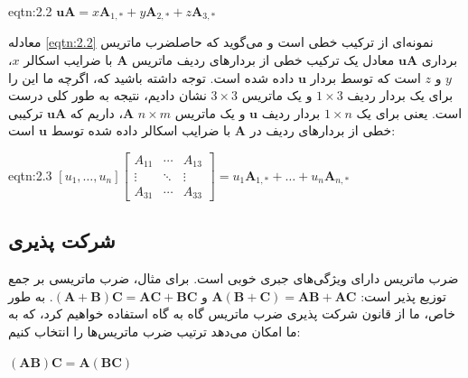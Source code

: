 {\begin{spacing}{1.5}
        \begin{eqtn}{eqtn:2.2}
            \centering
            $\textbf{uA}=x\textbf{A}_{1,*}+y\textbf{A}_{2,*}+z\textbf{A}_{3,*}$
        \end{eqtn}

        معادله \ref{eqtn:2.2} نمونه‌ای از ترکیب خطی است و
        می‌گوید که حاصلضرب ماتریس برداری $\textbf{uA}$ معادل یک ترکیب خطی از بردارهای ردیف ماتریس $\textbf{A}$ با ضرایب اسکالر $x$، $y$ و $z$ است که توسط بردار $\textbf{u}$ داده شده است.
        توجه داشته باشید که، اگرچه ما این را برای یک بردار ردیف $1\times 3$ و یک ماتریس $3\times 3$ نشان دادیم، نتیجه به طور کلی درست است.
        یعنی برای یک $1\times n$ بردار ردیف $\textbf{u}$ و یک ماتریس $n\times m$ $\textbf{A}$، داریم که $\textbf{uA}$ ترکیبی خطی از بردارهای ردیف در $\textbf{A}$ با ضرایب اسکالر داده شده توسط $\textbf{u}$ است:

        \begin{eqtn}{eqtn:2.3}
            \centering
            $[u_{1},\dots,u_{n}]\begin{bmatrix}
                                    A_{11} & \cdots & A_{13} \\
                                    \vdots & \ddots & \vdots \\
                                    A_{31} & \cdots & A_{33}
            \end{bmatrix}=u_{1}\textbf{A}_{1,*}+\dots+u_{n}\textbf{A}_{n,*}$
        \end{eqtn}
    \end{spacing}
}

\subsection{\textbf{شرکت پذیری}}
\label{subsec:2.2.3}
{
    \Large
    \begin{spacing}{1.5}
        ضرب ماتریس دارای ویژگی‌های جبری خوبی است. برای مثال، ضرب ماتریسی بر جمع توزیع پذیر است: $\textbf{A}(\textbf{B}+\textbf{C})=\textbf{AB}+\textbf{AC}$ و $(\textbf{A}+\textbf{B})\textbf{C}=\textbf{AC}+\textbf{BC}$.
        به طور خاص، ما از قانون شرکت پذیری ضرب ماتریس گاه به گاه استفاده خواهیم کرد، که به ما امکان می‌دهد ترتیب ضرب ماتریس‌ها را انتخاب کنیم:

        \begin{center}
            $(\textbf{AB})\textbf{C}=\textbf{A}(\textbf{BC})$
        \end{center}

    \end{spacing}
}


